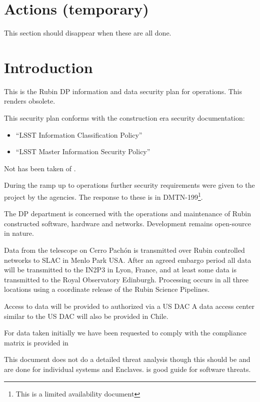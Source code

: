 
\section{Actions (temporary) }
This section should disappear when these are all done.
\listofactions

\section{Introduction}
This is the Rubin \gls{DP} information and data security plan for operations.
This renders  obsolete.

This security plan conforms with the construction era security documentation:
\begin{itemize}
\item “LSST Information Classification Policy” 
\item “LSST Master Information Security Policy” 
\end{itemize}

Not has been taken of \cite{TCISSG}.

During the ramp up to operations further security requirements were given to the project by the agencies.
The response to these is in \gls{DMTN}-199\footnote{This is a limited availability document}.

The \gls{DP} department is concerned with the operations and maintenance  of Rubin constructed software, hardware and networks.
Development remains open-source in nature.

Data from the telescope on Cerro Pach\'{o}n is transmitted over Rubin controlled networks to \gls{SLAC} in  Menlo Park USA.
After an agreed embargo period all data will be transmitted to the \gls{IN2P3} in Lyon, France, and at least some data is transmitted to the Royal Observatory Edinburgh.
Processing occurs in all three locations using a coordinate release of the Rubin \gls{Science Pipelines}.

Access to data will be provided to authorized via a US \gls{DAC}
A data access center similar to the \gls{US} \gls{DAC} will also be provided in Chile.

For data taken initially we have been requested to comply with  the compliance matrix is provided in 


This document does not do a detailed threat analysis though this should be and are done for individual systems and \gls{Enclave}s. \cite{TCISSG} is good guide for software threats.


